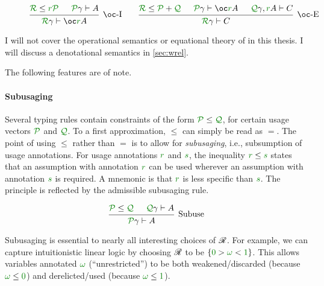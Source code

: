 \begin{figure}
\begin{displaymath}
\begin{matrix}
\begin{prooftree}
        \hypo{\grR \le \gr r\grP}
        \hypo{\grP\gamma \vdash A}
        \infer2[$\oc$-I]{\grR\gamma \vdash \oc\gr rA}
      \end{prooftree}
      &&
      \begin{prooftree}
        \hypo{\grR \le \grP + \grQ}
        \hypo{\grP\gamma \vdash \oc\gr rA}
        \hypo{\grQ\gamma, \gr rA \vdash C}
        \infer3[$\oc$-E]{\grR\gamma \vdash C}
      \end{prooftree}
    \end{matrix}
  \end{displaymath}
  \caption{\name{}}
  \label{fig:lr}
\end{figure}

I will not cover the operational semantics or equational theory of \name{} in
this thesis.
I will discuss a denotational semantics in \cref{sec:wrel}.

The following features are of note.

\paragraph{Subusaging}
Several typing rules contain constraints of the form $\grP \leq \grQ$, for
certain usage vectors $\grP$ and $\grQ$.
To a first approximation, $\leq$ can simply be read as $=$.
The point of using $\leq$ rather than $=$ is to allow for \emph{subusaging},
i.e., subsumption of usage annotations.
For usage annotations $\gr r$ and $\gr s$, the inequality $\gr r \leq \gr s$
states that an assumption with annotation $\gr r$ can be used wherever an
assumption with annotation $\gr s$ is required.
A mnemonic is that $\gr r$ is less specific than $\gr s$.
The principle is reflected by the admissible subusaging rule.

\[
  \begin{prooftree}
    \hypo{\grP \leq \grQ}
    \hypo{\grQ\gamma \vdash A}
    \infer2[Subuse]{\grP\gamma \vdash A}
  \end{prooftree}
\]

Subusaging is essential to nearly all interesting choices of $\mathscr R$.
For example, we can capture intuitionistic linear logic by choosing $\mathscr R$ to
be $\{\gr0 > \gr\omega < \gr1\}$.
This allows variables annotated $\gr\omega$ (``unrestricted'') to be both
weakened/discarded (because $\gr\omega \leq \gr0$) and derelicted/used
(because $\gr\omega \leq \gr1$).

